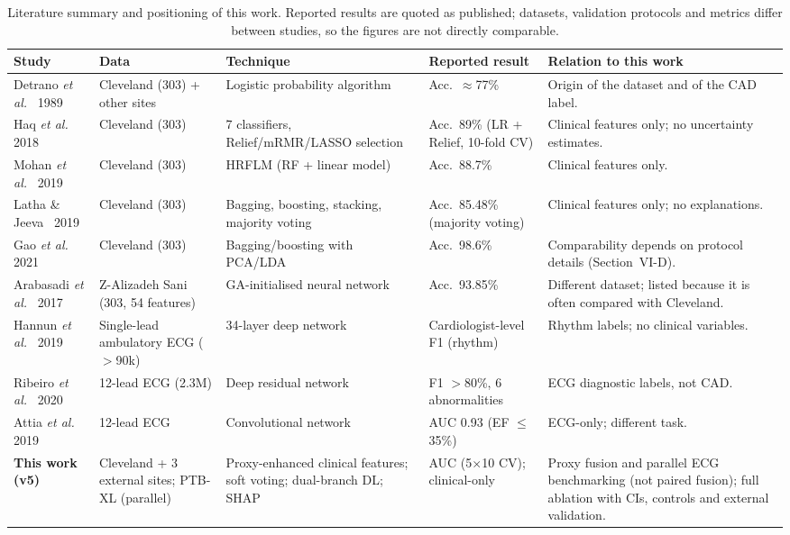 \begin{table}[!t]
\centering\scriptsize
\caption{Literature summary and positioning of this work. Reported results are quoted as published; datasets, validation protocols and metrics differ between studies, so the figures are not directly comparable.}
\label{tab:lit}
\setlength{\tabcolsep}{3pt}
\begin{adjustbox}{max width=\linewidth}
\begin{tabular}{p{2.6cm}p{2.4cm}p{3.2cm}p{3.2cm}p{5.2cm}}
\toprule
Study & Data & Technique & Reported result & Relation to this work\\
\midrule
Detrano \emph{et al.}~\cite{detrano1989} 1989 & Cleveland (303) + other sites & Logistic probability algorithm & Acc.\ $\approx$77\% & Origin of the dataset and of the CAD label.\\
Haq \emph{et al.}~\cite{haq2018} 2018 & Cleveland (303) & 7 classifiers, Relief/mRMR/LASSO selection & Acc.\ 89\% (LR + Relief, 10-fold CV) & Clinical features only; no uncertainty estimates.\\
Mohan \emph{et al.}~\cite{mohan2019} 2019 & Cleveland (303) & HRFLM (RF + linear model) & Acc.\ 88.7\% & Clinical features only.\\
Latha \& Jeeva~\cite{latha2019} 2019 & Cleveland (303) & Bagging, boosting, stacking, majority voting & Acc.\ 85.48\% (majority voting) & Clinical features only; no explanations.\\
Gao \emph{et al.}~\cite{gao2021} 2021 & Cleveland (303) & Bagging/boosting with PCA/LDA & Acc.\ 98.6\% & Comparability depends on protocol details (Section~VI-D).\\
Arabasadi \emph{et al.}~\cite{arabasadi2017} 2017 & Z-Alizadeh Sani (303, 54 features) & GA-initialised neural network & Acc.\ 93.85\% & Different dataset; listed because it is often compared with Cleveland.\\
Hannun \emph{et al.}~\cite{hannun2019} 2019 & Single-lead ambulatory ECG ($>$90k) & 34-layer deep network & Cardiologist-level F1 (rhythm) & Rhythm labels; no clinical variables.\\
Ribeiro \emph{et al.}~\cite{ribeiro2020} 2020 & 12-lead ECG (2.3M) & Deep residual network & F1 $>$80\%, 6 abnormalities & ECG diagnostic labels, not CAD.\\
Attia \emph{et al.}~\cite{attia2019} 2019 & 12-lead ECG & Convolutional network & AUC 0.93 (EF $\leq$35\%) & ECG-only; different task.\\
\midrule
\textbf{This work (v5)} & Cleveland + 3 external sites; PTB-XL (parallel) & Proxy-enhanced clinical features; soft voting; dual-branch DL; SHAP & AUC \fullAUC{} \fullAUCci{} (5$\times$10 CV); clinical-only \clinAUC{} & Proxy fusion and parallel ECG benchmarking (not paired fusion); full ablation with CIs, controls and external validation.\\
\bottomrule
\end{tabular}
\end{adjustbox}
\end{table}
